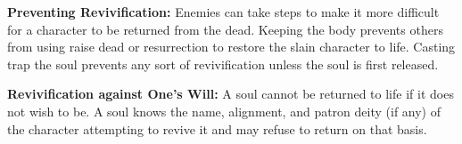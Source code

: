\textbf{Preventing Revivification:} Enemies can take steps to make it more difficult for a character to be returned from the dead. Keeping the body prevents others from using raise dead or resurrection to restore the slain character to life. Casting trap the soul prevents any sort of revivification unless the soul is first released.

\textbf{Revivification against One's Will:} A soul cannot be returned to life if it does not wish to be. A soul knows the name, alignment, and patron deity (if any) of the character attempting to revive it and may refuse to return on that basis.


